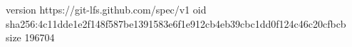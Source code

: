 version https://git-lfs.github.com/spec/v1
oid sha256:4c11dde1e2f148f587be1391583e6f1e912cb4eb39cbc1dd0f124c46c20cfbcb
size 196704

